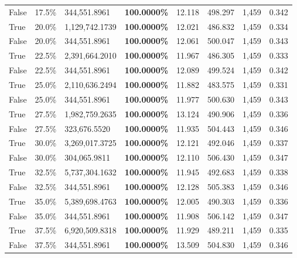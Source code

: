 \begin{table}[H]
\begin{tabular}{lllrllll}
\cline{1-8}
False & 17.5\% & 344,551.8961 & \bfseries \color{red} 100.0000\% & 12.118 & 498.297 & 1,459 & 0.342 \\
\cline{1-8}
True & 20.0\% & 1,129,742.1739 & \bfseries \color{red} 100.0000\% & 12.021 & 486.832 & 1,459 & 0.334 \\
\cline{1-8}
False & 20.0\% & 344,551.8961 & \bfseries \color{red} 100.0000\% & 12.061 & 500.047 & 1,459 & 0.343 \\
\cline{1-8}
True & 22.5\% & 2,391,664.2010 & \bfseries \color{red} 100.0000\% & 11.967 & 486.305 & 1,459 & 0.333 \\
\cline{1-8}
False & 22.5\% & 344,551.8961 & \bfseries \color{red} 100.0000\% & 12.089 & 499.524 & 1,459 & 0.342 \\
\cline{1-8}
True & 25.0\% & 2,110,636.2494 & \bfseries \color{red} 100.0000\% & 11.882 & 483.575 & 1,459 & 0.331 \\
\cline{1-8}
False & 25.0\% & 344,551.8961 & \bfseries \color{red} 100.0000\% & 11.977 & 500.630 & 1,459 & 0.343 \\
\cline{1-8}
True & 27.5\% & 1,982,759.2635 & \bfseries \color{red} 100.0000\% & 13.124 & 490.906 & 1,459 & 0.336 \\
\cline{1-8}
False & 27.5\% & 323,676.5520 & \bfseries \color{red} 100.0000\% & 11.935 & 504.443 & 1,459 & 0.346 \\
\cline{1-8}
True & 30.0\% & 3,269,017.3725 & \bfseries \color{red} 100.0000\% & 12.121 & 492.046 & 1,459 & 0.337 \\
\cline{1-8}
False & 30.0\% & \color{red} 304,065.9811 & \bfseries \color{red} 100.0000\% & 12.110 & 506.430 & 1,459 & 0.347 \\
\cline{1-8}
True & 32.5\% & 5,737,304.1632 & \bfseries \color{red} 100.0000\% & 11.945 & 492.683 & 1,459 & 0.338 \\
\cline{1-8}
False & 32.5\% & 344,551.8961 & \bfseries \color{red} 100.0000\% & 12.128 & 505.383 & 1,459 & 0.346 \\
\cline{1-8}
True & 35.0\% & 5,389,698.4763 & \bfseries \color{red} 100.0000\% & 12.005 & 490.303 & 1,459 & 0.336 \\
\cline{1-8}
False & 35.0\% & 344,551.8961 & \bfseries \color{red} 100.0000\% & 11.908 & 506.142 & 1,459 & 0.347 \\
\cline{1-8}
True & 37.5\% & 6,920,509.8318 & \bfseries \color{red} 100.0000\% & 11.929 & 489.211 & 1,459 & 0.335 \\
\cline{1-8}
False & 37.5\% & 344,551.8961 & \bfseries \color{red} 100.0000\% & 13.509 & 504.830 & 1,459 & 0.346 \\

\end{tabular}
\end{table}
